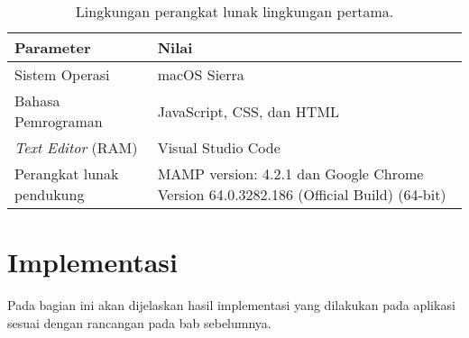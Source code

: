 \begin{enumerate}
		\begin{table}[h!]
		\centering
		\begin{tabular}{|| m{16em} | m{20em} ||} 
 		\hline
		{\bf Parameter} & {\bf Nilai} \\ [0.5ex] 
 		\hline\hline
		Sistem Operasi & macOS Sierra \\ 
		\hline
		Bahasa Pemrograman & JavaScript, CSS, dan HTML  \\ 
		\hline
		{\it Text Editor} (RAM) & Visual Studio Code \\ 
 		\hline
		Perangkat lunak pendukung & MAMP version: 4.2.1 dan Google Chrome Version 64.0.3282.186 (Official Build) (64-bit) \\ [1ex] 
 		\hline
		\end{tabular}
		\caption{Lingkungan perangkat lunak lingkungan pertama.}
		\label{table:1}
		\end{table}
\end{enumerate}

\section{Implementasi}
\label{sec:implementasi}
Pada bagian ini akan dijelaskan hasil implementasi yang dilakukan pada aplikasi sesuai dengan rancangan pada bab sebelumnya.

